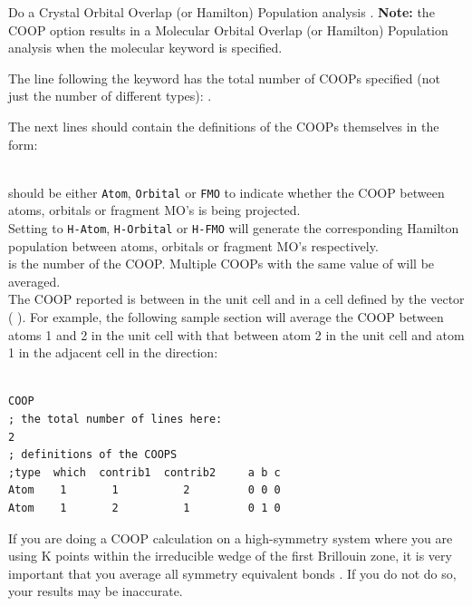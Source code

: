 Do a Crystal Orbital Overlap (or Hamilton) Population analysis \cite{eht2,cohp3,mulliken,coop}. {\bf Note:} the {\sf COOP} option results in a Molecular Orbital Overlap (or Hamilton) Population analysis when the {\sf molecular} keyword is specified.

\noindent The line following the keyword has the total number of COOPs
specified (not just the number of different types): .

\noindent The next  lines should contain the definitions
of the COOPs themselves in the form:

    
  \\

\noindent {} should be either {\tt Atom}, {\tt Orbital} or {\tt FMO} to indicate
whether the COOP between atoms, orbitals or fragment MO's is being projected. \\

\noindent Setting  to {\tt H-Atom}, {\tt H-Orbital} or {\tt H-FMO} will generate the corresponding Hamilton population between atoms, orbitals or fragment MO's respectively. \\

\noindent {} is the number of the COOP.  Multiple COOPs with the same
value of  will be averaged. \\

The COOP reported is between  in the unit cell and
 in a cell defined by the vector ( 
).  For example, the following sample section will average 
the COOP between atoms 1 and 2 in the unit cell with that between atom
2 in the unit cell and atom 1 in the adjacent cell in the 
direction:

\shrinkspacing
\begin{verbatim}

COOP
; the total number of lines here:
2
; definitions of the COOPS
;type  which  contrib1  contrib2     a b c
Atom    1       1          2         0 0 0
Atom    1       2          1         0 1 0

\end{verbatim}
\resumespacing

  If you are doing a COOP calculation on a high-symmetry
system where you are using K points within the irreducible wedge of
the first Brillouin zone, it is very important that you average all
symmetry equivalent bonds \cite{thesis}.
If you do not do so, your results may be inaccurate.

